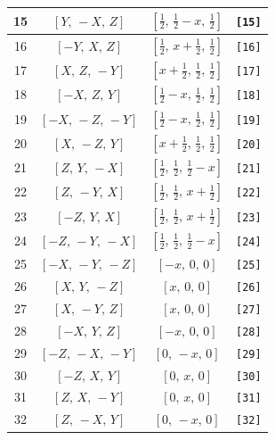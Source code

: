 \documentclass[fleqn,8pt]{jsarticle}
\begin{document}
\begin{longtable}{cccc}
15 & $\left[ Y,\, - X,\, Z \right]$ & $\left[ \frac{1}{2},\, \frac{1}{2} - x,\, \frac{1}{2} \right]$ & {\tt [15]} \\ \hline
16 & $\left[ - Y,\, X,\, Z \right]$ & $\left[ \frac{1}{2},\, x + \frac{1}{2},\, \frac{1}{2} \right]$ & {\tt [16]} \\ \hline
17 & $\left[ X,\, Z,\, - Y \right]$ & $\left[ x + \frac{1}{2},\, \frac{1}{2},\, \frac{1}{2} \right]$ & {\tt [17]} \\ \hline
18 & $\left[ - X,\, Z,\, Y \right]$ & $\left[ \frac{1}{2} - x,\, \frac{1}{2},\, \frac{1}{2} \right]$ & {\tt [18]} \\ \hline
19 & $\left[ - X,\, - Z,\, - Y \right]$ & $\left[ \frac{1}{2} - x,\, \frac{1}{2},\, \frac{1}{2} \right]$ & {\tt [19]} \\ \hline
20 & $\left[ X,\, - Z,\, Y \right]$ & $\left[ x + \frac{1}{2},\, \frac{1}{2},\, \frac{1}{2} \right]$ & {\tt [20]} \\ \hline
21 & $\left[ Z,\, Y,\, - X \right]$ & $\left[ \frac{1}{2},\, \frac{1}{2},\, \frac{1}{2} - x \right]$ & {\tt [21]} \\ \hline
22 & $\left[ Z,\, - Y,\, X \right]$ & $\left[ \frac{1}{2},\, \frac{1}{2},\, x + \frac{1}{2} \right]$ & {\tt [22]} \\ \hline
23 & $\left[ - Z,\, Y,\, X \right]$ & $\left[ \frac{1}{2},\, \frac{1}{2},\, x + \frac{1}{2} \right]$ & {\tt [23]} \\ \hline
24 & $\left[ - Z,\, - Y,\, - X \right]$ & $\left[ \frac{1}{2},\, \frac{1}{2},\, \frac{1}{2} - x \right]$ & {\tt [24]} \\ \hline
25 & $\left[ - X,\, - Y,\, - Z \right]$ & $\left[ - x,\, 0,\, 0 \right]$ & {\tt [25]} \\ \hline
26 & $\left[ X,\, Y,\, - Z \right]$ & $\left[ x,\, 0,\, 0 \right]$ & {\tt [26]} \\ \hline
27 & $\left[ X,\, - Y,\, Z \right]$ & $\left[ x,\, 0,\, 0 \right]$ & {\tt [27]} \\ \hline
28 & $\left[ - X,\, Y,\, Z \right]$ & $\left[ - x,\, 0,\, 0 \right]$ & {\tt [28]} \\ \hline
29 & $\left[ - Z,\, - X,\, - Y \right]$ & $\left[ 0,\, - x,\, 0 \right]$ & {\tt [29]} \\ \hline
30 & $\left[ - Z,\, X,\, Y \right]$ & $\left[ 0,\, x,\, 0 \right]$ & {\tt [30]} \\ \hline
31 & $\left[ Z,\, X,\, - Y \right]$ & $\left[ 0,\, x,\, 0 \right]$ & {\tt [31]} \\ \hline
32 & $\left[ Z,\, - X,\, Y \right]$ & $\left[ 0,\, - x,\, 0 \right]$ & {\tt [32]} \\ \hline

\end{longtable}
\end{document}
